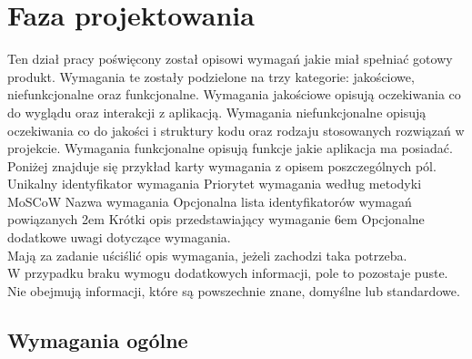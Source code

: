 \newcommand{\tabeladwiekolumnywiersz}[2]{
    \parbox[c][1em][c]{\textwidth}{
        #1
    } &
    \parbox[c][2.5em][c]{\textwidth}{
        #2
    }
    \\
    \hline
}

\newcommand{\tabeladwiekolumny}[3]{
    \begin{center}
        \begin{tabularx}{1\textwidth} {
                | >{\hsize=#1\hsize}X
                | >{\hsize=#2\hsize}X |}
            \hline

            #3
        \end{tabularx}
    \end{center}
}

\newcommand{\tabeladwiekolumnywykres}[3]{
    \tabeladwiekolumnywiersz{
        #1
    }{
        \rule{30.3em / #3 * #2}{1.2em}
    }
}

\section{Faza projektowania}
Ten dział pracy poświęcony został opisowi wymagań jakie miał spełniać gotowy produkt. Wymagania te zostały podzielone na trzy kategorie: jakościowe, niefunkcjonalne oraz funkcjonalne. Wymagania jakościowe opisują oczekiwania co do wyglądu oraz interakcji z aplikacją. Wymagania niefunkcjonalne opisują oczekiwania co do jakości i struktury kodu oraz rodzaju stosowanych rozwiązań w projekcie. Wymagania funkcjonalne opisują funkcje jakie aplikacja ma posiadać.\\

Poniżej znajduje się przykład karty wymagania z opisem poszczególnych pól.
\wymaganie
{Unikalny identyfikator wymagania}
{Priorytet wymagania według metodyki MoSCoW}
{Nazwa wymagania}
{Opcjonalna lista identyfikatorów wymagań powiązanych}
{2em}{
    Krótki opis przedstawiający wymaganie
}
{6em}{
    Opcjonalne dodatkowe uwagi dotyczące wymagania.\\
    Mają za zadanie uściślić opis wymagania, jeżeli zachodzi taka potrzeba.\\
    W przypadku braku wymogu dodatkowych informacji, pole to pozostaje puste.\\
    Nie obejmują informacji, które są powszechnie znane, domyślne lub standardowe.
}

\newpage

\subsection{Wymagania ogólne}


